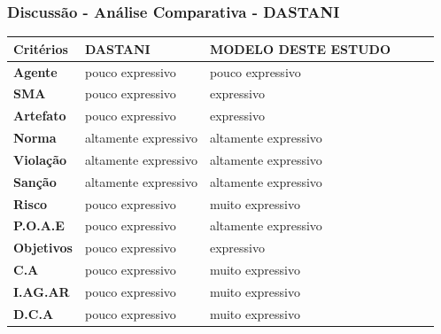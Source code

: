 \documentclass{beamer}
\begin{document}
\begin{frame}
	\frametitle{Discussão - Análise Comparativa - DASTANI}
	\begin{table}[H]
	    \begin{tabular}{|l|l|l|l|l|l|}
	            \textbf{Critérios} 	&	 \textbf{DASTANI}     	&	 \textbf{MODELO DESTE ESTUDO} \\ \hline
		        \textbf{Agente}    	&	 pouco expressivo     	&	 pouco expressivo             \\ \hline
		        \textbf{SMA}       	&	 pouco expressivo     	&	 expressivo                   \\ \hline
		        \textbf{Artefato}  	&	 pouco expressivo     	&	 expressivo                   \\ \hline
		        \textbf{Norma}     	&	 altamente expressivo 	&	 altamente expressivo         \\ \hline
		        \textbf{Violação}  	&	 altamente expressivo 	&	 altamente expressivo         \\ \hline
		        \textbf{Sanção}    	&	 altamente expressivo 	&	 altamente expressivo         \\ \hline
		        \textbf{Risco}     	&	 pouco expressivo     	&	 muito expressivo             \\ \hline
		        \textbf{P.O.A.E}   	&	 pouco expressivo     	&	 altamente expressivo         \\ \hline
		        \textbf{Objetivos} 	&	 pouco expressivo     	&	 expressivo             	  \\ \hline
		        \textbf{C.A}       	&	 pouco expressivo     	&	 muito expressivo             \\ \hline
		        \textbf{I.AG.AR}   	&	 pouco expressivo     	&	 muito expressivo             \\ \hline
		        \textbf{D.C.A}     	&	 pouco expressivo     	&	 muito expressivo             \\ \hline
	    \end{tabular}
	\end{table}
\end{frame}
\end{document}
